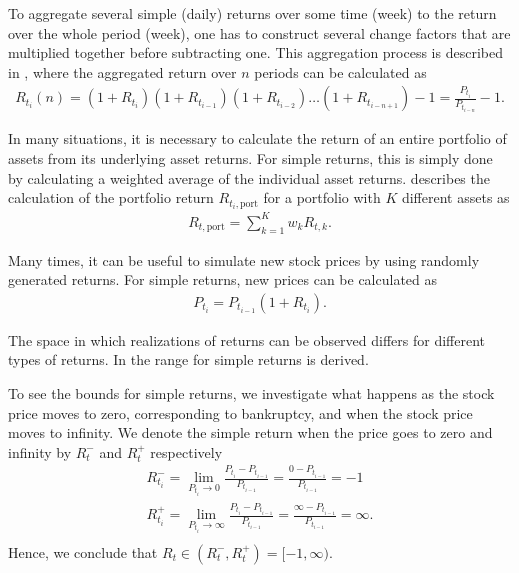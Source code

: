 To aggregate several simple (daily) returns over some time (week) to the return over the whole period (week), one has to construct several change factors that are multiplied together before subtracting one. This aggregation process is described in \citet[p.~3]{Danielsson2011}, where the aggregated return over $n$ periods can be calculated as
\begin{align*}
    R_{t_{i}}(n) = (1+R_{t_{i}})(1+R_{t_{i-1}})(1+R_{t_{i-2}})\dots (1+R_{t_{i-n+1}}) -1 = \frac{P_{t_{i}}}{P_{t_{i-n}}}-1.
\end{align*}

In many situations, it is necessary to calculate the return of an entire portfolio of assets from its underlying asset returns. For simple returns, this is simply done by calculating a weighted average of the individual asset returns. \citet[p.~3]{Danielsson2011} describes the calculation of the portfolio return $R_{t_i,\mathrm{port}}$ for a portfolio with $K$ different assets as 
\begin{align*}
    R_{t,\mathrm{port}} = \sum_{k=1}^K w_kR_{t,k}.
\end{align*}

Many times, it can be useful to simulate new stock prices by using randomly generated returns. For simple returns, new prices can be calculated as
\begin{align*}
    P_{t_{i}} = P_{t_{i-1}}(1+R_{t_{i}}).
\end{align*}

The space in which realizations of returns can be observed differs for different types of returns. In  the range for simple returns is derived. 

\begin{example}\label{ex:BoundsSimpleReturns}
    To see the bounds for simple returns, we investigate what happens as the stock price moves to zero, corresponding to bankruptcy, and when the stock price moves to infinity. We denote the simple return when the price goes to zero and infinity by $R_t^-$ and $R_t^+$ respectively   
    \begin{align*}
        R_{t_i}^- = \lim_{P_{t_i} \to 0} \frac{P_{t_i}-P_{t_{i-1}}}{P_{t_{i-1}}} = \frac{0-P_{t_{i-1}}}{P_{t_{i-1}}} =  -1 \\
        R_{t_i}^+ =\lim_{P_{t_i} \to \infty} \frac{P_{t_i}-P_{t_{i-1}}}{P_{t_{i-1}}} = \frac{\infty-P_{t_{i-1}}}{P_{t_{i-1}}}=\infty.\\    
    \end{align*}
Hence, we conclude that $R_t \in (R_t^-,R_t^+) = [-1,\infty)$. 
\end{example}



